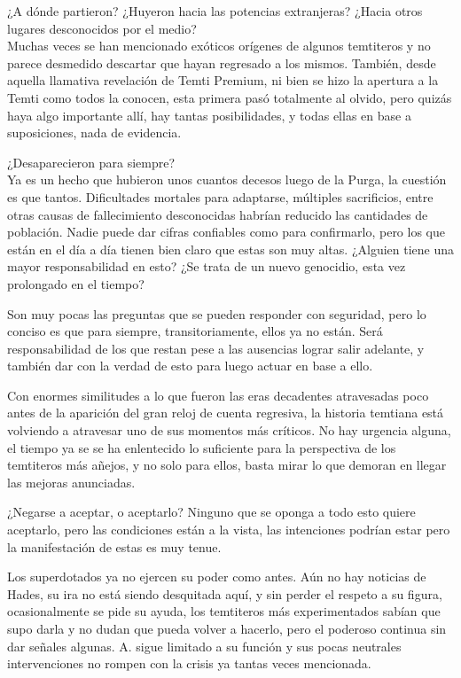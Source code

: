 \documentclass[
  spanish,
]{book}
\begin{document}
¿A dónde partieron? ¿Huyeron hacia las potencias extranjeras? ¿Hacia otros lugares desconocidos por el medio?\\
Muchas veces se han mencionado exóticos orígenes de algunos temtiteros y no parece desmedido descartar que hayan regresado a los mismos. También, desde aquella llamativa revelación de Temti Premium, ni bien se hizo la apertura a la Temti como todos la conocen, esta primera pasó totalmente al olvido, pero quizás haya algo importante allí, hay tantas posibilidades, y todas ellas en base a suposiciones, nada de evidencia.

¿Desaparecieron para siempre?\\
Ya es un hecho que hubieron unos cuantos decesos luego de la Purga, la cuestión es que tantos. Dificultades mortales para adaptarse, múltiples sacrificios, entre otras causas de fallecimiento desconocidas habrían reducido las cantidades de población. Nadie puede dar cifras confiables como para confirmarlo, pero los que están en el día a día tienen bien claro que estas son muy altas. ¿Alguien tiene una mayor responsabilidad en esto? ¿Se trata de un nuevo genocidio, esta vez prolongado en el tiempo?

Son muy pocas las preguntas que se pueden responder con seguridad, pero lo conciso es que para siempre, transitoriamente, ellos ya no están. Será responsabilidad de los que restan pese a las ausencias lograr salir adelante, y también dar con la verdad de esto para luego actuar en base a ello.

Con enormes similitudes a lo que fueron las eras decadentes atravesadas poco antes de la aparición del gran reloj de cuenta regresiva, la historia temtiana está volviendo a atravesar uno de sus momentos más críticos. No hay urgencia alguna, el tiempo ya se se ha enlentecido lo suficiente para la perspectiva de los temtiteros más añejos, y no solo para ellos, basta mirar lo que demoran en llegar las mejoras anunciadas.

¿Negarse a aceptar, o aceptarlo? Ninguno que se oponga a todo esto quiere aceptarlo, pero las condiciones están a la vista, las intenciones podrían estar pero la manifestación de estas es muy tenue.

Los superdotados ya no ejercen su poder como antes. Aún no hay noticias de Hades, su ira no está siendo desquitada aquí, y sin perder el respeto a su figura, ocasionalmente se pide su ayuda, los temtiteros más experimentados sabían que supo darla y no dudan que pueda volver a hacerlo, pero el poderoso continua sin dar señales algunas. A. sigue limitado a su función y sus pocas neutrales intervenciones no rompen con la crisis ya tantas veces mencionada.
\end{document}
